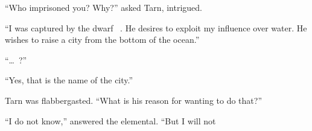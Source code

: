 ``Who imprisoned you?  Why?''  asked Tarn, intrigued.

``I was captured by the dwarf \mothzam\ \driktur.  He desires to exploit my influence over water.  He wishes to raise a city from the bottom of the ocean.''

``\ldots\ \valdunmir?''

``Yes, that is the name of the city.''

Tarn was flabbergasted. ``What is his reason for wanting to do that?''

``I do not know,'' answered the elemental.  ``But I will not 





















